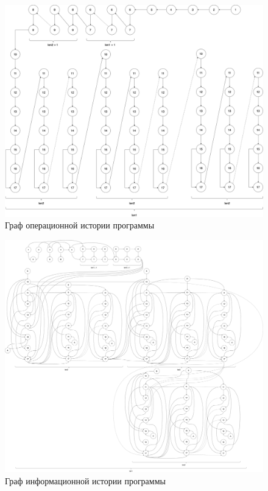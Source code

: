 \documentclass[a4paper,14pt, unknownkeysallowed]{extreport}
\begin{document}
\clearpage

\begin{figure}[h]
	\centering
	\includegraphics[scale=0.22]{img/oper_history_graph.png}
	\caption{Граф операционной истории программы}
	\label{fig:oper_his}
\end{figure}

\clearpage

\begin{figure}[h]
	\centering
	\includegraphics[scale=0.13]{img/inf_history_graph.png}
	\caption{Граф информационной истории программы}
	\label{fig:inf_his}
\end{figure}

\clearpage
\end{document}
